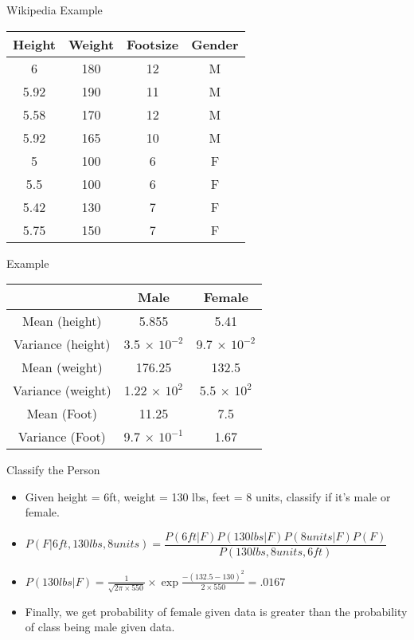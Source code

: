 \documentclass{beamer}
\begin{document}
\begin{frame}{Wikipedia Example}

    \begin{center}
    \begin{tabular}{|c|c|c|c|}
    \hline
    Height&Weight&Footsize&Gender\\
    \hline
    \hline
         6 & 180& 12& M \\
         5.92 & 190& 11& M \\
         5.58 & 170& 12& M \\
         5.92 & 165& 10& M \\
         5 & 100& 6& F \\
         5.5 & 100& 6& F \\
         5.42 & 130& 7& F \\
         5.75 & 150& 7& F \\
         \hline
    \end{tabular}
    
    \end{center}
    
\end{frame}

\begin{frame}{Example}
    \begin{center}

    \begin{tabular}{|c|c|c|}
    \hline
     &Male&Female\\
     \hline
     \hline
     Mean (height) & 5.855 & 5.41  \\
     Variance (height) & 3.5 $\times$ $10^{-2}$ & 9.7 $\times$ $10^{-2}$  \\
     Mean (weight) & 176.25 & 132.5  \\
     Variance (weight) & 1.22 $\times$ $10^{2}$ & 5.5 $\times$ $10^{2}$   \\
     Mean (Foot) & 11.25 & 7.5  \\
     Variance (Foot) & 9.7 $\times$ $10^{-1}$ & 1.67  \\
    \hline
    \hline
    \end{tabular}
    \end{center}
\end{frame}

\begin{frame}{Classify the Person}
    \begin{itemize}
\item Given height = 6ft, weight = 130 lbs, feet = 8 units, classify if it's male or female.
        \item $P(F|6ft, 130 lbs, 8 units) = \dfrac{P(6 ft|F)P(130 lbs|F)P(8 units|F)P(F)}{P(130 lbs, 8 units, 6 ft)}$
        \pause
\item $P(130 lbs|F) = \frac{1}{\sqrt{2\pi\times 550}}\times \exp{\frac{-(132.5-130)^2}{2\times 550}} = .0167$
        \item Finally, we get probability of female given data is greater than the probability of class being male given data.

    \end{itemize}
    
\end{frame}
\end{document}

